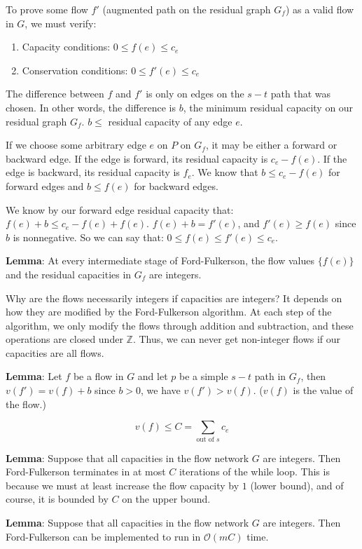 \documentclass{article}
\newcommand{\Oh}{\mathcal{O}}
\begin{document}
To prove some flow $f'$ (augmented path on the residual graph $G_f$) as a valid flow in $G$, we must verify:
\begin{enumerate}
    \item Capacity conditions: $0 \leq f(e) \leq c_e$
    \item Conservation conditions: $0 \leq f'(e) \leq c_e$
\end{enumerate}

The difference between $f$ and $f'$ is only on edges on the $s-t$ path that was chosen. In other words, the difference is $b$, the minimum residual capacity on our residual graph $G_f$. $b \leq$ residual capacity of any edge $e$.

If we choose some arbitrary edge $e$ on $P$ on $G_f$, it may be either a forward or backward edge. If the edge is forward, its residual capacity is $c_e - f(e)$. If the edge is backward, its residual capacity is $f_e$. We know that $b \leq c_e - f(e)$ for forward edges and $b \leq f(e)$ for backward edges.

We know by our forward edge residual capacity that: $f(e) + b \leq c_e - f(e) + f(e)$. $f(e) + b = f'(e)$, and $f'(e) \geq f(e)$ since $b$ is nonnegative. So we can say that: $0 \leq f(e) \leq f'(e) \leq c_e$.

\textbf{Lemma}: At every intermediate stage of Ford-Fulkerson, the flow values $\{f(e)\}$ and the residual capacities in $G_f$ are integers.

Why are the flows necessarily integers if capacities are integers? It depends on how they are modified by the Ford-Fulkerson algorithm. At each step of the algorithm, we only modify the flows through addition and subtraction, and these operations are closed under $\mathbb{Z}$. Thus, we can never get non-integer flows if our capacities are all flows.

\textbf{Lemma}: Let $f$ be a flow in $G$ and let $p$ be a simple $s-t$ path in $G_f$, then $v(f') = v(f) + b$ since $b > 0$, we have $v(f') > v(f)$. ($v(f)$ is the value of the flow.)

$$v(f) \leq C = \sum_{\text{out of }s} c_e$$

\textbf{Lemma}: Suppose that all capacities in the flow network $G$ are integers. Then Ford-Fulkerson terminates in at most $C$ iterations of the while loop. This is because we must at least increase the flow capacity by $1$ (lower bound), and of course, it is bounded by $C$ on the upper bound.

\textbf{Lemma}: Suppose that all capacities in the flow network $G$ are integers. Then Ford-Fulkerson can be implemented to run in $\Oh(mC)$ time.
\end{document}
